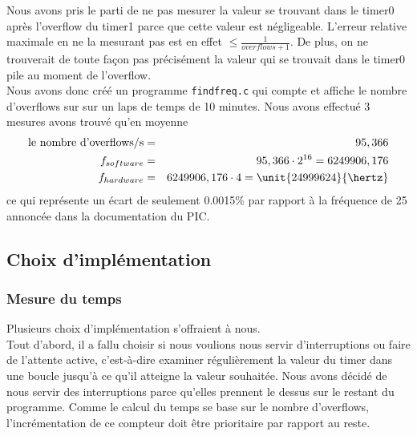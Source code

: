 \documentclass[12pt,a4paper]{article}
\begin{document}
 Nous avons pris le parti de ne pas mesurer la valeur se trouvant dans le timer0 après l'overflow du timer1 parce que cette valeur est négligeable. L'erreur relative maximale en ne la mesurant pas est en effet $\leq \frac{1}{overflows + 1}$. De plus, on ne trouverait de toute façon pas précisément la valeur qui se
 trouvait dans le timer0 pile au moment de l'overflow.\\
 
Nous avons donc créé un programme \texttt{findfreq.c} qui compte et affiche le nombre d'overflows sur sur un laps de temps de 10 minutes. Nous avons effectué 3 mesures avons trouvé qu'en moyenne
  \begin{eqnarray*}
 \text{le nombre d'overflows/s} &=& 95,366\\
f_{software}  &=& 95,366 \cdot 2^{16} = 6249906,176\\
f_{hardware} &=& 6249906,176 \cdot 4 = \unit{24999624}{\hertz}
 \end{eqnarray*}
 ce qui représente un écart de seulement 0.0015\% par rapport à la fréquence de \unit{25}{\mega\hertz} annoncée dans la documentation du PIC.
 
    \subsection{Choix d'implémentation}
    
    \subsubsection{Mesure du temps}
    
    Plusieurs choix d'implémentation s'offraient à nous.\\
    
    Tout d'abord, il a fallu choisir si nous voulions nous servir d'interruptions ou faire de l'attente active, c'est-à-dire examiner régulièrement la valeur du timer dans une boucle jusqu'à ce qu'il atteigne la valeur souhaitée. Nous avons décidé de nous servir des interruptions parce qu'elles prennent le dessus sur le restant du programme. Comme le calcul du temps se base sur le nombre d'overflows, l'incrémentation de ce compteur doit être prioritaire par rapport au reste.\\
    
\end{document}
